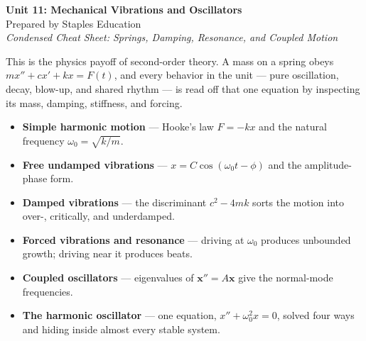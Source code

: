 




\begin{center}
    {\LARGE \bfseries Unit 11: Mechanical Vibrations and Oscillators}\\[6pt]
    {\large Prepared by Staples Education}\\[4pt]
    {\itshape Condensed Cheat Sheet: Springs, Damping, Resonance, and Coupled Motion}
\end{center}

\vspace{0.4em}

\begin{topicsbox}
This is the physics payoff of second-order theory. A mass on a spring obeys
$m x'' + c x' + k x = F(t)$, and every behavior in the unit --- pure oscillation,
decay, blow-up, and shared rhythm --- is read off that one equation by inspecting
its mass, damping, stiffness, and forcing.
\begin{itemize}[leftmargin=1.4em, itemsep=3pt]
    \item \textbf{Simple harmonic motion} --- Hooke's law $F=-kx$ and the natural
          frequency $\omega_0=\sqrt{k/m}$.
    \item \textbf{Free undamped vibrations} --- $x = C\cos(\omega_0 t - \phi)$ and the
          amplitude-phase form.
    \item \textbf{Damped vibrations} --- the discriminant $c^2-4mk$ sorts the motion
          into over-, critically, and underdamped.
    \item \textbf{Forced vibrations and resonance} --- driving at $\omega_0$ produces
          unbounded growth; driving near it produces beats.
    \item \textbf{Coupled oscillators} --- eigenvalues of $\mathbf{x}''=A\mathbf{x}$
          give the normal-mode frequencies.
    \item \textbf{The harmonic oscillator} --- one equation, $x''+\omega_0^2 x=0$,
          solved four ways and hiding inside almost every stable system.
\end{itemize}
\end{topicsbox}

